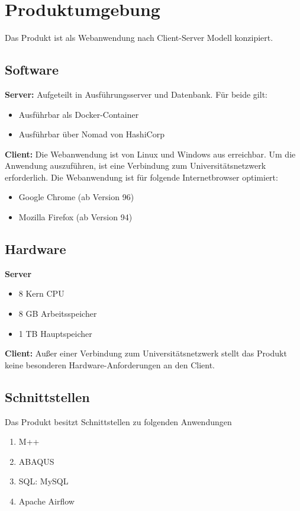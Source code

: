 \chapter{Produktumgebung}
Das Produkt ist als Webanwendung nach \gls{Client-Server} Modell konzipiert.

\section{Software}
\textbf{Server:}
Aufgeteilt in Ausführungsserver und Datenbank. Für beide gilt:
\begin{itemize} %
    \setlength\itemsep{-1em}
    \item Ausführbar als Docker-Container
    \item Ausführbar über Nomad von HashiCorp
\end{itemize}
\textbf{Client:} Die Webanwendung ist von Linux und Windows aus erreichbar. 
Um die Anwendung auszuführen, ist eine Verbindung zum Universitätsnetzwerk erforderlich.
Die Webanwendung ist für folgende Internetbrowser optimiert:
\begin{itemize}
    \setlength\itemsep{-1em}
    \item Google Chrome (ab Version 96)
    \item Mozilla Firefox (ab Version 94) %
\end{itemize}
\newpage
\section{Hardware}
\textbf{Server}
\begin{itemize}
    \setlength\itemsep{-1em}
    \item 8 Kern CPU
    \item 8 GB Arbeitsspeicher
    \item 1 TB Hauptspeicher
\end{itemize}

\textbf{Client:}
Außer einer Verbindung zum Universitätsnetzwerk stellt das Produkt keine besonderen Hardware-Anforderungen an den Client.

\section{Schnittstellen}
\renewcommand{\labelenumi}{/S\arabic{enumi}0/}
Das Produkt besitzt Schnittstellen zu folgenden Anwendungen
\begin{enumerate}
    \setlength\itemsep{-1em}
    \item \gls{M++}
    \item \gls{ABAQUS}
    \item \gls{SQL}: MySQL
    \item \gls{Apache Airflow}
\end{enumerate}
